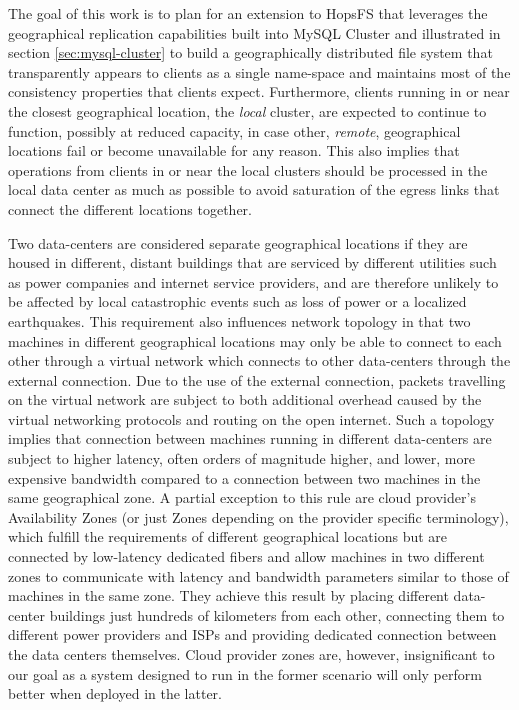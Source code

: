 The goal of this work is to plan for an extension to HopsFS that leverages the geographical replication capabilities built into MySQL Cluster and illustrated in section \ref{sec:mysql-cluster} to build a geographically distributed file system that transparently appears to clients as a single name-space and maintains most of the consistency properties that clients expect.
Furthermore, clients running in or near the closest geographical location, the \emph{local} cluster, are expected to continue to function, possibly at reduced capacity, in case other, \emph{remote}, geographical locations fail or become unavailable for any reason.
This also implies that operations from clients in or near the local clusters should be processed in the local data center as much as possible to avoid saturation of the egress links that connect the different locations together.

Two data-centers are considered separate geographical locations if they are housed in different, distant buildings that are serviced by different utilities such as power companies and internet service providers, and are therefore unlikely to be affected by local catastrophic events such as loss of power or a localized earthquakes.
This requirement also influences network topology in that two machines in different geographical locations may only be able to connect to each other through a virtual network which connects to other data-centers through the external connection.
Due to the use of the external connection, packets travelling on the virtual network are subject to both additional overhead caused by the virtual networking protocols and routing on the open internet.
Such a topology implies that connection between machines running in different data-centers are subject to higher latency, often orders of magnitude higher, and lower, more expensive bandwidth compared to a connection between two machines in the same geographical zone.
A partial exception to this rule are cloud provider's Availability Zones (or just Zones depending on the provider specific terminology), which fulfill the requirements of different geographical locations but are connected by low-latency dedicated fibers and allow machines in two different zones to communicate with latency and bandwidth parameters similar to those of machines in the same zone.
They achieve this result by placing different data-center buildings just hundreds of kilometers from each other, connecting them to different power providers and ISPs and providing dedicated connection between the data centers themselves.
Cloud provider zones are, however, insignificant to our goal as a system designed to run in the former scenario will only perform better when deployed in the latter.

